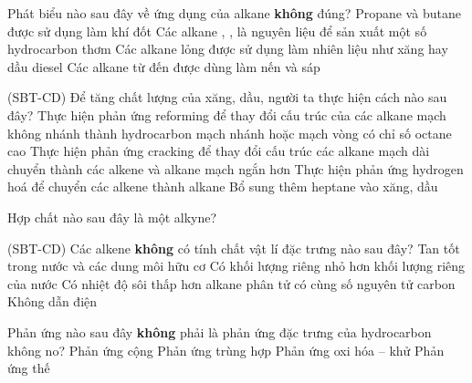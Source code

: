 \documentclass[12pt,a4paper]{article}
\begin{document}
\begin{ex}
 Phát biểu nào sau đây về ứng dụng của alkane \textbf{không} đúng?
\choice
{Propane  và butane  được sử dụng làm khí đốt}
{Các alkane , ,  là nguyên liệu để sản xuất một số hydrocarbon thơm}
{Các alkane lỏng được sử dụng làm nhiên liệu như xăng hay dầu diesel}
{\True Các alkane từ  đến  được dùng làm nến và sáp}
\end{ex}

\begin{ex}
(SBT-CD) Để tăng chất lượng của xăng, dầu, người ta thực hiện cách nào sau đây?
\choice
{\True Thực hiện phản ứng reforming để thay đổi cấu trúc của các alkane mạch không nhánh thành hydrocarbon mạch nhánh hoặc mạch vòng có chỉ số octane cao}
{Thực hiện phản ứng cracking để thay đổi cấu trúc các alkane mạch dài chuyển thành các alkene và alkane mạch ngắn hơn}
{Thực hiện phản ứng hydrogen hoá để chuyển các alkene thành alkane}
{Bổ sung thêm heptane vào xăng, dầu}
\end{ex}

\begin{ex}
 Hợp chất nào sau đây là một alkyne?
\choice
{}
{}
{\True {}}
{}
\end{ex}

\begin{ex}
(SBT-CD) Các alkene \textbf{không} có tính chất vật lí đặc trưng nào sau đây?
\choice
{\True Tan tốt trong nước và các dung môi hữu cơ}
{Có khối lượng riêng nhỏ hơn khối lượng riêng của nước}
{Có nhiệt độ sôi thấp hơn alkane phân tử có cùng số nguyên tử carbon}
{Không dẫn điện}
\end{ex}

\begin{ex}
 Phản ứng nào sau đây \textbf{không} phải là phản ứng đặc trưng của hydrocarbon không no?
\choice
{Phản ứng cộng}
{Phản ứng trùng hợp}
{Phản ứng oxi hóa -- khử}
{\True Phản ứng thế}
\end{ex}
\end{document}
